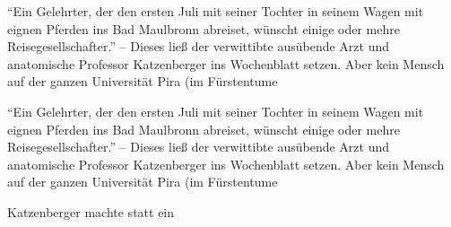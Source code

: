 \documentclass[11pt]{book}
\begin{document}
\makeatletter
\beginnumbering
\pstart
``Ein Gelehrter, \the\line@num  der den ersten Juli mit seiner Tochter in seinem Wagen mit eignen Pferden ins Bad Maulbronn abreiset, wünscht einige oder mehre Reisegesellschafter.'' -- Dieses ließ der verwittibte ausübende Arzt und anatomische Professor Katzenberger ins Wochenblatt setzen. Aber kein Mensch auf der ganzen Universität Pira (im Fürstentume
\pend

\pstart
``Ein Gelehrter, \the\line@num  der den ersten Juli mit seiner Tochter in seinem Wagen mit eignen Pferden ins Bad Maulbronn abreiset, wünscht einige oder mehre Reisegesellschafter.'' -- Dieses ließ der verwittibte ausübende Arzt und anatomische Professor Katzenberger ins Wochenblatt setzen. Aber kein Mensch auf der ganzen Universität Pira (im Fürstentume
\pend

\pstart

Katzenberger machte statt ein\pend

\pstartline
\end{document}

